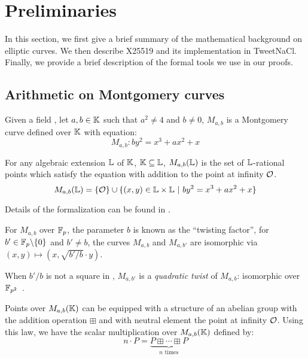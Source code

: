 \section{Preliminaries}
\label{sec:preliminaries}

In this section, we first give a brief summary of the mathematical background
on elliptic curves. We then describe X25519 and its implementation in TweetNaCl.
Finally, we provide a brief description of the formal tools we use in our proofs.





\subsection{Arithmetic on Montgomery curves}
\label{subsec:arithmetic-montgomery}

\begin{dfn}
  Given a field \K, let $a,b \in \mathbb{K}$ such that $a^2 \neq 4$ and $b \neq 0$,
  $M_{a,b}$ is a Montgomery curve defined over $\mathbb{K}$ with equation:
  $$M_{a,b}: by^2 = x^3 + ax^2 + x$$
\end{dfn}

\begin{dfn}
  For any algebraic extension $\mathbb{L}$ of $\mathbb{K}$, $\mathbb{K} \subseteq	\mathbb{L}$,
  $M_{a,b}(\mathbb{L})$ is the set of $\mathbb{L}$-rational points which satisfy the equation with
  addition to the point at infinity $\mathcal{O}$.
  $$M_{a,b}(\mathbb{L}) = \{\mathcal{O}\} \cup \{(x,y) \in \mathbb{L} \times \mathbb{L}~|~by^2 = x^3 + ax^2 + x\}$$
\end{dfn}
Details of the formalization can be found in .

For $M_{a,b}$ over $\mathbb{F}_{p}$, the parameter $b$ is known as the ``twisting factor'',
for $b'\in \mathbb{F}_{p}\backslash\{0\}$ and $b' \neq b$, the curves $M_{a,b}$ and $M_{a,b'}$
are isomorphic via $(x,y) \mapsto (x, \sqrt{b'/b} \cdot y)$.

\begin{dfn}
  When $b'/b$ is not a square in , $M_{a,b'}$ is a \emph{quadratic twist} of $M_{a,b}$:
  isomorphic over $\mathbb{F}_{p^2}$~\cite{cryptoeprint:2017:212}.
\end{dfn}

Points over $M_{a,b}(\mathbb{K})$ can be equipped with a structure of an abelian group
with the addition operation $\boxplus$ and with neutral element the point at infinity $\mathcal{O}$.
Using this law, we have the scalar multiplication over $M_{a,b}(\mathbb{K})$ defined by:
  $$n\cdot P = \underbrace{P \boxplus \cdots \boxplus P}_{n\text{ times}}$$

